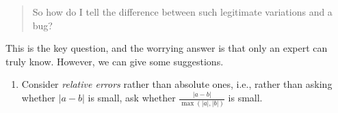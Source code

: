 \begin{quote}
So how do I tell the difference between such legitimate variations and a bug?
\end{quote}
This is the key question, and the worrying answer is that only an expert can truly know. However, we can give some suggestions.
\begin{enumerate}
\item Consider \emph{relative errors} rather than absolute ones, i.e., rather than asking whether $|a-b|$ is small, ask whether $\frac{|a-b|}{\max(|a|,|b|)}$ is small.
\end{enumerate}
